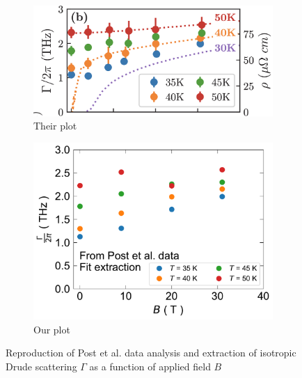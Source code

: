 \begin{figure}
\centering
\begin{subfigure}{0.45\textwidth}
    \includegraphics[width=\textwidth]{figures/gamma_theirs.png}
    \caption{Their plot}
    \label{fig:gamma_ours}
\end{subfigure}
\hfill
\begin{subfigure}{0.45\textwidth}
    \includegraphics[width=\textwidth]{figures/fitting_Drude_extracted_Gamma.pdf}
    \caption{Our plot}
    \label{fig:gamma_theirs}
\end{subfigure}
        
\caption{Reproduction of Post et al. data analysis and extraction of isotropic Drude scattering $\Gamma$ as a function of applied field $B$}
\label{fig:reproduction_post}
\end{figure}
